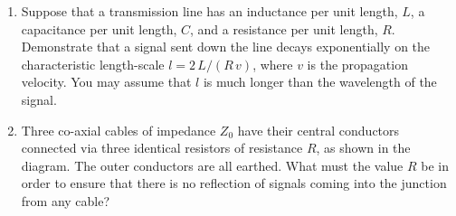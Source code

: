 {\begin{enumerate}
two identical parallel cylindrical wires of radius $a$ and spacing $d$. 
\item Suppose that a transmission line has an inductance per unit length, $L$,
a capacitance per unit length, $C$, and a resistance per unit length, $R$. 
Demonstrate that a signal sent down the line decays exponentially
on the characteristic length-scale $l = 2\,L/(R\,v)$, where $v$ is the
propagation velocity. You may assume that $l$ is much longer
than the wavelength of the signal.
\item Three co-axial cables of impedance $Z_0$ have their central
conductors connected via three identical resistors of resistance $R$, as shown in the diagram. The outer conductors are all earthed.
What must the value $R$ be in order to ensure that there is no reflection of signals coming into the
junction from any cable?
\epsfysize=2in
\centerline{}
\end{enumerate}
\renewcommand{\theenumi}{arabic{enumi}}
}
